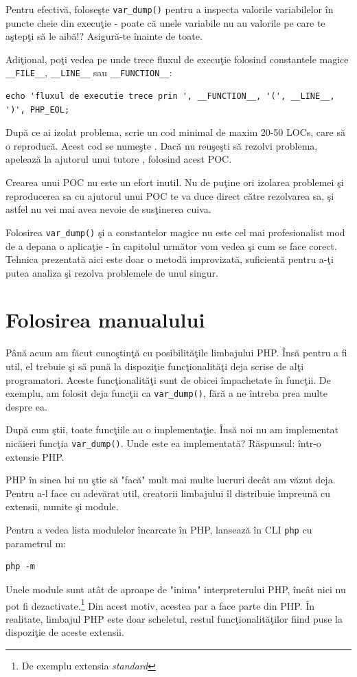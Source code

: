 Pentru  efectivă, foloseşte \texttt{var\_dump()}
pentru a inspecta valorile variabilelor în puncte
cheie din execuţie - poate că unele variabile nu au
valorile pe care te aştepţi să le aibă!? Asigură-te
înainte de toate.

Adiţional, poţi vedea pe unde trece fluxul de execuţie
folosind constantele magice \texttt{\_\_FILE\_\_},
\texttt{\_\_LINE\_\_} sau \texttt{\_\_FUNCTION\_\_}:
\begin{lstlisting}
echo 'fluxul de executie trece prin ', __FUNCTION__, '(', __LINE__, ')', PHP_EOL;
\end{lstlisting}

După ce ai izolat problema, scrie un cod minimal de maxim
20-50 LOCs, care să o reproducă. Acest cod se numeşte
. Dacă nu reuşeşti să rezolvi
problema, apelează la ajutorul unui tutore {\phpro},
folosind acest POC.

Crearea unui POC nu este un efort inutil. Nu de puţine ori
izolarea problemei şi reproducerea sa cu ajutorul
unui POC te va duce direct către rezolvarea sa,
şi astfel nu vei mai avea nevoie de susţinerea cuiva.

Folosirea \texttt{var\_dump()} şi a constantelor magice
nu este cel mai profesionalist mod de a depana o aplicaţie -
în capitolul următor vom vedea şi cum se face corect.
Tehnica prezentată aici este doar o metodă improvizată,
suficientă pentru a-ţi putea analiza şi rezolva
problemele de unul singur.

\section{Folosirea manualului}
Până acum am făcut cunoştinţă cu posibilităţile limbajului PHP.
Însă pentru a fi util, el trebuie şi să pună la dispoziţie
funcţionalităţi deja scrise de alţi programatori. Aceste
funcţionalităţi sunt de obicei împachetate în funcţii.
De exemplu, am folosit deja funcţii ca \texttt{var\_dump()},
fără a ne întreba prea multe despre ea.

După cum ştii, toate funcţiile au o implementaţie. Însă
noi nu am implementat nicăieri funcţia \texttt{var\_dump()}. Unde
este ea implementată? Răspunsul: într-o extensie PHP.

PHP în sinea lui nu ştie să "facă" mult mai multe lucruri decât
am văzut deja. Pentru a-l face cu adevărat util, creatorii
limbajului îl distribuie împreună cu extensii, numite şi module.

Pentru a vedea lista modulelor încarcate în PHP, lansează
în CLI \texttt{php} cu parametrul \-m:
\begin{verbatim}
php -m
\end{verbatim}
Unele module sunt atât de aproape de "inima" interpreterului
PHP, încât nici nu pot fi dezactivate.\footnote{De exemplu
extensia \textit{standard}} Din acest motiv, acestea
par a face parte din PHP. În realitate, limbajul PHP
este doar scheletul, restul funcţionalităţilor
fiind puse la dispoziţie de aceste extensii.

